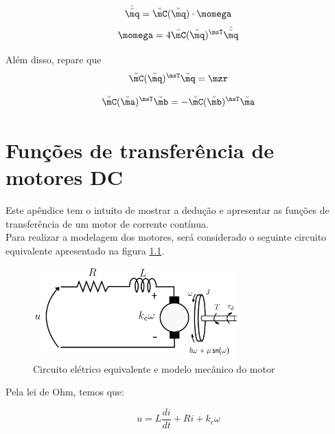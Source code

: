 \documentclass[]{politex}
\begin{document}
\begin{equation} \label{eq:dQuat2w}
\dot{\breve{\mq}} = \breve{\mC}(\breve{\mq}) \cdot \momega
\end{equation}
\begin{equation}
\momega = 4 \breve{\mC} (\breve{\mq})^\msT \dot{\breve{\mq}}
\end{equation}

Além disso, repare que 
\begin{equation} \label{eq:CQuatZero}
\breve{\mC} (\breve{\mq})^\msT \breve{\mq} = \mzr
\end{equation}

\begin{equation}
\breve{\mC} (\breve{\ma})^\msT \breve{\mb} = -\breve{\mC} (\breve{\mb})^\msT \breve{\ma}
\end{equation}

\chapter{Funções de transferência de motores DC} \label{ap:FuncoesDeTransferencia}

Este apêndice tem o intuito de mostrar a dedução e apresentar as funções de transferência de um motor de corrente contínua. \\

Para realizar a modelagem dos motores, será considerado o seguinte circuito equivalente apresentado na figura \ref{fig:CEM1}.


\begin{figure}[!h]
     \centering
     \includegraphics[width=0.7\textwidth]{imagens/DCMotor.png}
     \caption{Circuito elétrico equivalente e modelo mecânico do motor}
     \label{fig:CEM1}
\end{figure}


Pela lei de Ohm, temos que:

\begin{equation}
\label{eletricaMotor}
	   u = L \frac{di}{dt} + R i + k_{e} \omega
\end{equation}
\end{document}
